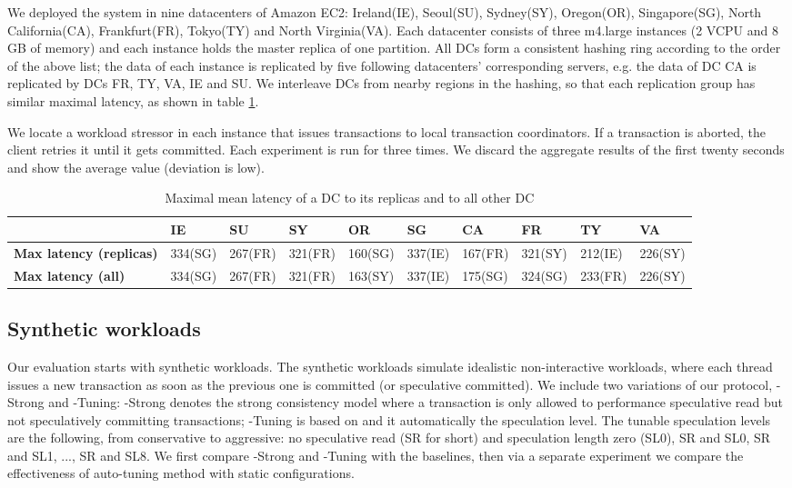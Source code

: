 We deployed the system in nine datacenters of Amazon EC2: Ireland(IE), Seoul(SU), Sydney(SY), Oregon(OR), Singapore(SG), North California(CA), Frankfurt(FR), Tokyo(TY) and North Virginia(VA). Each datacenter consists of three m4.large instances (2 VCPU and 8 GB of memory) and each instance holds the master replica of one partition. All DCs form a consistent hashing ring according to the order of the above list; the data of each instance is replicated by five following datacenters' corresponding servers, e.g. the data of DC CA is replicated by DCs FR, TY, VA, IE and SU. We interleave DCs from nearby regions in the hashing, so that each replication group has similar maximal latency, as shown in table \ref{tab:latency}.

We locate a workload stressor in each instance that issues transactions to local transaction coordinators. If a transaction is aborted, the client retries it until it gets committed. Each experiment is run for three times. We discard the aggregate results of the first twenty seconds and show the average value (deviation is low).

\begin{table}
\small
\begin{center}
  \begin{tabular}{l |  l | l | l| l | l | l| l| l |l } 
     & IE & SU& SY& OR & SG & CA &  FR & TY & VA  \\ \hline
  \textbf{Max latency (replicas)} & 334(SG) & 267(FR) & 321(FR) & 160(SG)  & 337(IE) & 167(FR) & 321(SY)& 212(IE)  &  226(SY)  \\   \hline
  \textbf{Max latency (all)} &  334(SG) &  267(FR) & 321(FR)  & 163(SY) & 337(IE) & 175(SG) & 324(SG)  & 233(FR)  & 226(SY) \\ \hline
  \end{tabular}
\end{center}
\caption{Maximal mean latency of a DC to its replicas and to all other DC}
\label{tab:latency}
\end{table}


\subsection{Synthetic workloads}
Our evaluation starts with synthetic workloads. The synthetic workloads simulate idealistic non-interactive workloads, where each thread issues a new transaction as soon as the previous one is committed (or speculative committed). We include two variations of our protocol, {\specula}-Strong and  {\specula}-Tuning:  {\specula}-Strong denotes the strong consistency model where a transaction is only allowed to performance speculative read but not speculatively committing transactions;  {\specula}-Tuning is based on \specula and it automatically the speculation level. The tunable speculation levels are the following, from conservative to aggressive: no speculative read (SR for short) and speculation length zero (SL0), SR and SL0, SR and SL1, ..., SR and SL8. We first compare {\specula}-Strong and {\specula}-Tuning with the baselines, then via a separate experiment we compare the effectiveness of auto-tuning method with static configurations.

